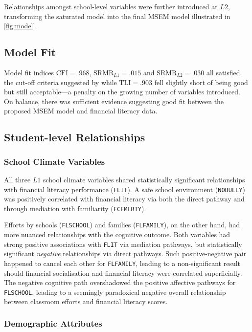 \documentclass[a4paper,11pt,UKenglish,twoside,openright]{report}\usepackage[]{graphicx}\usepackage[]{color}
\begin{document}
Relationships amongst school-level variables were further introduced at $L2$, transforming the saturated model into the final MSEM model illustrated in \cref{fig:model}.

\subsection{Model Fit}

Model fit indices $\text{CFI} = .968$, $\text{SRMR}_{L1} = .015$ and $\text{SRMR}_{L2} =.030$ all satisfied the cut-off criteria suggested by \textcite{hu:1999} while $\text{TLI} = .903$ fell slightly short of being good but still acceptable---a penalty on the growing number of variables introduced. On balance, there was sufficient evidence suggesting good fit between the proposed MSEM model and financial literacy data.

\subsection{Student-level Relationships}

\subsubsection{School Climate Variables}

All three $L1$ school climate variables shared statistically significant relationships with financial literacy performance (\texttt{FLIT}). A safe school environment (\texttt{NOBULLY}) was positively correlated with financial literacy via both the direct pathway and through mediation with familiarity (\texttt{FCFMLRTY}).

Efforts by schools (\texttt{FLSCHOOL}) and families (\texttt{FLFAMILY}), on the other hand, had more nuanced relationships with the cognitive outcome. Both variables had strong positive associations with \texttt{FLIT} via mediation pathways, but statistically significant \emph{negative} relationships via direct pathways. Such positive-negative pair happened to cancel each other for \texttt{FLFAMILY}, leading to a non-significant result should financial socialisation and financial literacy were correlated superficially. The negative cognitive path overshadowed the positive affective pathways for \texttt{FLSCHOOL}, leading to a seemingly paradoxical negative overall relationship between classroom efforts and financial literacy scores.

\subsubsection{Demographic Attributes}
\end{document}
